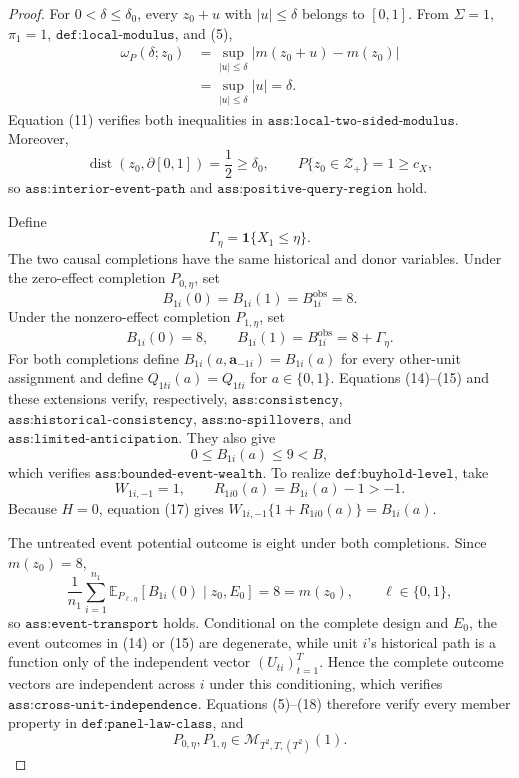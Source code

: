 \documentclass{article}
\begin{document}
\begin{proof}
For \(0<\delta\le\delta_0\), every \(z_0+u\) with \(|u|\le\delta\) belongs to \([0,1]\).  From \(\Sigma=1\), \(\pi_1=1\), \(\texttt{def:local-modulus}\), and (5),
\[
\begin{aligned}
\omega_P(\delta;z_0)
&=\sup_{|u|\le\delta}|m(z_0+u)-m(z_0)|\\
&=\sup_{|u|\le\delta}|u|
=\delta.
\end{aligned}
\tag{11}
\]
Equation (11) verifies both inequalities in \(\texttt{ass:local-two-sided-modulus}\).  Moreover,
\[
\operatorname{dist}(z_0,\partial[0,1])=\frac12\ge\delta_0,
\qquad
P\{z_0\in\mathcal Z_+\}=1\ge c_X,
\tag{12}
\]
so \(\texttt{ass:interior-event-path}\) and \(\texttt{ass:positive-query-region}\) hold.

Define
\[
\Gamma_\eta=\mathbf 1\{X_1\le\eta\}.
\tag{13}
\]
The two causal completions have the same historical and donor variables.  Under the zero-effect completion \(P_{0,\eta}\), set
\[
B_{1i}(0)=B_{1i}(1)=B_{1i}^{\mathrm{obs}}=8.
\tag{14}
\]
Under the nonzero-effect completion \(P_{1,\eta}\), set
\[
B_{1i}(0)=8,
\qquad
B_{1i}(1)=B_{1i}^{\mathrm{obs}}=8+\Gamma_\eta.
\tag{15}
\]
For both completions define \(B_{1i}(a,\mathbf a_{-1i})=B_{1i}(a)\) for every other-unit assignment and define \(Q_{1ti}(a)=Q_{1ti}\) for \(a\in\{0,1\}\).  Equations (14)--(15) and these extensions verify, respectively, \(\texttt{ass:consistency}\), \(\texttt{ass:historical-consistency}\), \(\texttt{ass:no-spillovers}\), and \(\texttt{ass:limited-anticipation}\).  They also give
\[
0\le B_{1i}(a)\le9<B,
\tag{16}
\]
which verifies \(\texttt{ass:bounded-event-wealth}\).  To realize \(\texttt{def:buyhold-level}\), take
\[
W_{1i,-1}=1,
\qquad
R_{1i0}(a)=B_{1i}(a)-1>-1.
\tag{17}
\]
Because \(H=0\), equation (17) gives \(W_{1i,-1}\{1+R_{1i0}(a)\}=B_{1i}(a)\).

The untreated event potential outcome is eight under both completions.  Since \(m(z_0)=8\),
\[
\frac1{n_1}\sum_{i=1}^{n_1}
\mathbb E_{P_{\ell,\eta}}[B_{1i}(0)\mid z_0,E_0]
=8=m(z_0),
\qquad \ell\in\{0,1\},
\tag{18}
\]
so \(\texttt{ass:event-transport}\) holds.  Conditional on the complete design and \(E_0\), the event outcomes in (14) or (15) are degenerate, while unit \(i\)'s historical path is a function only of the independent vector \((U_{ti})_{t=1}^{T}\).  Hence the complete outcome vectors are independent across \(i\) under this conditioning, which verifies \(\texttt{ass:cross-unit-independence}\).  Equations (5)--(18) therefore verify every member property in \(\texttt{def:panel-law-class}\), and
\[
P_{0,\eta},P_{1,\eta}
\in\mathcal M_{T^2,T,(T^2)}(1).
\tag{19}
\]


\end{proof}
\end{document}

